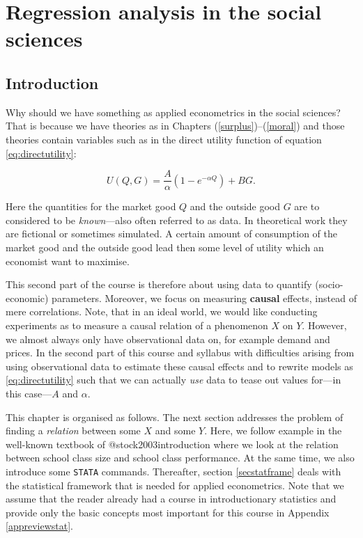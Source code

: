 \documentclass[
]{book}
\begin{document}
\hypertarget{regression-analysis-in-the-social-sciences}{%
\chapter{Regression analysis in the social sciences}\label{regression-analysis-in-the-social-sciences}}

\hypertarget{introduction-12}{%
\section{Introduction}\label{introduction-12}}

Why should we have something as applied econometrics in the social sciences? That is because we have theories as in Chapters (\ref{surplus})--(\ref{moral}) and those theories contain variables such as in the direct utility function of equation \eqref{eq:directutility}:

\begin{equation}
U(Q,G) = \frac{A}{\alpha}\left( 1- e^{-\alpha Q} \right ) + BG.
\end{equation}

Here the quantities for the market good \(Q\) and the outside good \(G\) are to considered to be \emph{known}---also often referred to as data. In theoretical work they are fictional or sometimes simulated. A certain amount of consumption of the market good and the outside good lead then some level of utility which an economist want to maximise.

This second part of the course is therefore about using data to quantify (socio-economic) parameters. Moreover, we focus on measuring \textbf{causal} effects, instead of mere correlations. Note, that in an ideal world, we would like conducting experiments as to measure a causal relation of a phenomenon \(X\) on \(Y\). However, we almost always only have observational data on, for example demand and prices. In the second part of this course and syllabus with difficulties arising from using observational data to estimate these causal effects and to rewrite models as \eqref{eq:directutility} such that we can actually \emph{use} data to tease out values for---in this case---\(A\) and \(\alpha\).

This chapter is organised as follows. The next section addresses the problem of finding a \emph{relation} between some \(X\) and some \(Y\). Here, we follow example in the well-known textbook of @stock2003introduction where we look at the relation between school class size and school class performance. At the same time, we also introduce some \texttt{STATA} commands. Thereafter, section \ref{secstatframe} deals with the statistical framework that is needed for applied econometrics. Note that we assume that the reader already had a course in introductionary statistics and provide only the basic concepts most important for this course in Appendix \ref{appreviewstat}.
\end{document}
